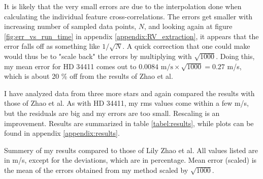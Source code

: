It is likely that the very small errors are due to the interpolation done when calculating the individual feature cross-correlations. The errors get smaller with increasing number of sampled data points, $N$, and looking again at figure \ref{fig:err_vs_run_time} in appendix \ref{appendix:RV_extraction}, it appears that the error falls off as something like $1/\sqrt{N}$. A quick correction that one could make would thus be to "scale back" the errors by multiplying with $\sqrt{1000}$. Doing this, my mean error for HD 34411 comes out to $0.0084 \text{ m/s} \times \sqrt{1000} = 0.27$ m/s, which is about 20 \% off from the results of Zhao et al.

I have analyzed data from three more stars and again compared the results with those of Zhao et al. As with HD 34411, my rms values come within a few m/s, but the residuals are big and my errors are too small. Rescaling is an improvement. Results are summarized in table \ref{tabel:results}, while plots can be found in appendix \ref{appendix:results}.

\begin{table}%
    \begin{wide}  
        \caption{Summery of my results compared to those of Lily Zhao et al. All values listed are in m/s, except for the deviations, which are in percentage. Mean error (scaled) is the mean of the errors obtained from my method scaled by $\sqrt{1000}$.}
        \label{tabel:results}
    \end{wide}
\end{table}
